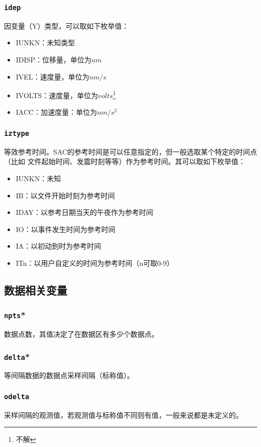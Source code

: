 \subsubsection{\texttt{idep}}
因变量（Y）类型，可以取如下枚举值：
\begin{itemize}
\ttfamily
\item IUNKN：未知类型
\item IDISP：位移量，单位为$nm$
\item IVEL：速度量，单位为$nm/s$
\item IVOLTS：速度量，单位为$volts$\footnote{不解}
\item IACC：加速度量：单位为$nm/s^2$	
\end{itemize}

\subsubsection{\texttt{iztype}}
等效参考时间。SAC的参考时间是可以任意指定的，但一般选取某个特定的时间点（比如
文件起始时间、发震时刻等等）作为参考时间。其可以取如下枚举值：
\begin{itemize}
\ttfamily
\item IUNKN：未知
\item IB：以文件开始时刻为参考时间
\item IDAY：以参考日期当天的午夜作为参考时间
\item IO：以事件发生时间为参考时间
\item IA：以初动到时为参考时间
\item ITn：以用户自定义的时间为参考时间（n可取0-9）
\end{itemize}

\subsection{数据相关变量}
\subsubsection{\texttt{npts}*}
数据点数，其值决定了在数据区有多少个数据点。

\subsubsection{\texttt{delta}*}
等间隔数据的数据点采样间隔（标称值）。

\subsubsection{\texttt{odelta}}
采样间隔的观测值，若观测值与标称值不同则有值，一般来说都是未定义的。

